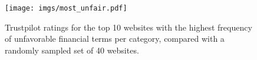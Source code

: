 \begin{figure}[!t] 
 \centering
 \texttt{[image: imgs/most\_unfair.pdf]}
 \caption{Trustpilot ratings for the top 10 websites with the highest frequency of unfavorable financial terms per category, compared with a randomly sampled set of 40 websites.}
\label{fig:user_star}
\end{figure}